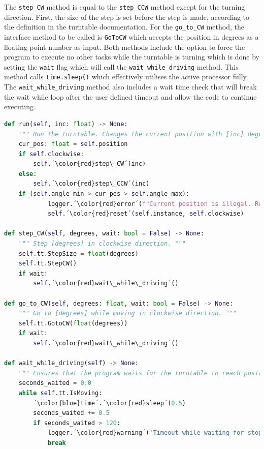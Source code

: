 The \verb+step_CW+ method is equal to the \verb+step_CCW+ method except for the turning direction. First, the size of the step is set before the step is made, according to the definition in the turntable documentation. For the \verb+go_to_CW+ method, the interface method to be called is \verb+GoToCW+ which accepts the position in degrees as a floating point number as input. Both methods include the option to force the program to execute no other tasks while the turntable is turning which is done by setting the \verb+wait+ flag which will call the \verb+wait_while_driving+ method. This method calls \verb+time.sleep()+ which effectively utilises the active processor fully. The \verb+wait_while_driving+ method also includes a wait time check that will break the wait while loop after the user defined timeout and allow the code to continue executing. 

\begin{lstlisting}[language=Python, caption=Methods for turning the turntable to the wanted position.]
def run(self, inc: float) -> None:
    """ Run the turntable. Changes the current position with [inc] degrees. """
    cur_pos: float = self.position
    if self.clockwise:
        self.´\color{red}step\_CW´(inc)
    else:
        self.´\color{red}step\_CCW´(inc)
    if (self.angle_min > cur_pos > self.angle_max):
            logger.´\color{red}error´(f"Current position is illegal. Resetting: {self.instance}")
            self.´\color{red}reset´(self.instance, self.clockwise)

def step_CW(self, degrees, wait: bool = False) -> None:
    """ Step [degrees] in clockwise direction. """
    self.tt.StepSize = float(degrees)
    self.tt.StepCW()
    if wait:
        self.´\color{red}wait\_while\_driving´()

def go_to_CW(self, degrees: float, wait: bool = False) -> None:
    """ Go to [degrees] while moving in clockwise direction. """
    self.tt.GotoCW(float(degrees))
    if wait:
        self.´\color{red}wait\_while\_driving´()

def wait_while_driving(self) -> None:
    """ Ensures that the program waits for the turntable to reach position before execution further code. """
    seconds_waited = 0.0
    while self.tt.IsMoving:
        ´\color{blue}time´.´\color{red}sleep´(0.5)
        seconds_waited += 0.5
        if seconds_waited > 120:
            logger.´\color{red}warning´('Timeout while waiting for stop.')
            break
\end{lstlisting} \label{lst2}

